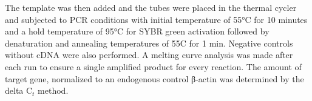 The template was then added and the tubes were placed in the thermal cycler and subjected to PCR conditions with  initial temperature of 55°C for 10 minutes and a hold temperature of 95°C for SYBR green activation followed by denaturation and annealing temperatures of 55C for 1 min. Negative controls without cDNA were also performed. A melting curve analysis was made after each run to ensure a single amplified product for every reaction. The amount of target gene, normalized to an endogenous control β-actin was determined by the delta C$_t$ method.
